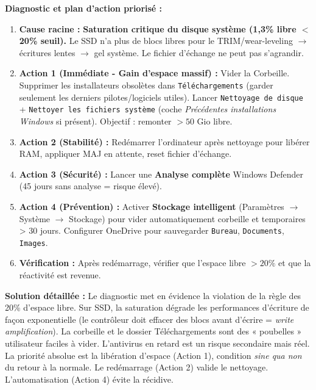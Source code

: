 \documentclass[11pt]{article}
\begin{document}
\begin{exoresolu}
\textbf{Diagnostic et plan d'action priorisé :}
\begin{enumerate}
    \item \textbf{Cause racine :} \textbf{Saturation critique du disque système (1,3\% libre $<$ 20\% seuil).} Le SSD n'a plus de blocs libres pour le TRIM/wear-leveling $\rightarrow$ écritures lentes $\rightarrow$ gel système. Le fichier d'échange ne peut pas s'agrandir.
    \item \textbf{Action 1 (Immédiate - Gain d'espace massif) :} Vider la Corbeille. Supprimer les installateurs obsolètes dans \texttt{Téléchargements} (garder seulement les derniers pilotes/logiciels utiles). Lancer \texttt{Nettoyage de disque} + \texttt{Nettoyer les fichiers système} (coche \emph{Précédentes installations Windows} si présent). Objectif : remonter $> 50$ Gio libre.
    \item \textbf{Action 2 (Stabilité) :} Redémarrer l'ordinateur après nettoyage pour libérer RAM, appliquer MAJ en attente, reset fichier d'échange.
    \item \textbf{Action 3 (Sécurité) :} Lancer une \textbf{Analyse complète} Windows Defender (45 jours sans analyse = risque élevé).
    \item \textbf{Action 4 (Prévention) :} Activer \textbf{Stockage intelligent} (Paramètres $\rightarrow$ Système $\rightarrow$ Stockage) pour vider automatiquement corbeille et temporaires > 30 jours. Configurer OneDrive pour sauvegarder \texttt{Bureau}, \texttt{Documents}, \texttt{Images}.
    \item \textbf{Vérification :} Après redémarrage, vérifier que l'espace libre $> 20\%$ et que la réactivité est revenue.
\end{enumerate}
\tcblower
\textbf{Solution détaillée :}
Le diagnostic met en évidence la violation de la règle des 20\% d'espace libre. Sur SSD, la saturation dégrade les performances d'écriture de façon exponentielle (le contrôleur doit effacer des blocs avant d'écrire = \emph{write amplification}). La corbeille et le dossier Téléchargements sont des « poubelles » utilisateur faciles à vider. L'antivirus en retard est un risque secondaire mais réel. La priorité absolue est la libération d'espace (Action 1), condition \textit{sine qua non} du retour à la normale. Le redémarrage (Action 2) valide le nettoyage. L'automatisation (Action 4) évite la récidive.
\end{exoresolu}
\end{document}
